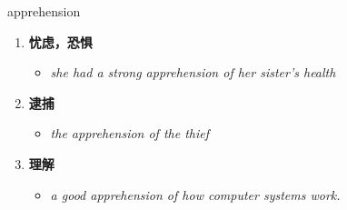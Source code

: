 
\begin{frame}
{\huge apprehension}
\begin{center}
\begin{enumerate}\Large
  \item \textbf{忧虑，恐惧}
  \begin{itemize}
    \item \em{\Large{she had a strong apprehension of her sister's health}}
  \end{itemize}
  \item \textbf{逮捕}
  \begin{itemize}
    \item \em{\Large{the apprehension of the thief}}
  \end{itemize}
  \item \textbf{理解}
  \begin{itemize}
    \item \em{\Large{a good apprehension of how computer systems work.}}
  \end{itemize}
\end{enumerate}
\end{center}
\end{frame}
